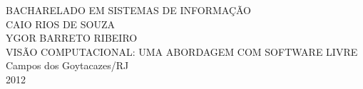 \begin{titlepage}
 \begin{figure}[ht]
 \centering
 \end{figure}
 \begin{center}
   {\large BACHARELADO EM SISTEMAS DE INFORMAÇÃO} \\ [3.5cm]
   {\large CAIO RIOS DE SOUZA} \\
   {\large YGOR BARRETO RIBEIRO} \\ [4cm]
   {\large VISÃO COMPUTACIONAL: UMA ABORDAGEM COM SOFTWARE LIVRE} \\
   \vfill
   {\large Campos dos Goytacazes/RJ} \\
   {\large 2012}
 \end{center}
\end{titlepage}
